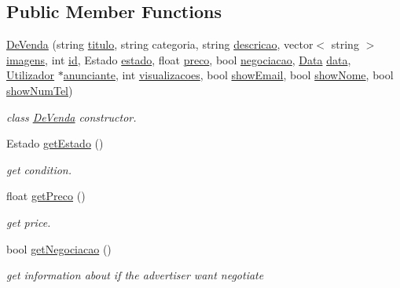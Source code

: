 \subsection*{Public Member Functions}
\begin{DoxyCompactItemize}
\item 
\hyperlink{class_de_venda_aa45120d3a08d48875df0068965e83362}{De\+Venda} (string \hyperlink{class_anuncio_adb34bedd8220f42b9ee37662c21313e6}{titulo}, string categoria, string \hyperlink{class_anuncio_aa6a9eb8d08cb06d16061b006eb2c8b97}{descricao}, vector$<$ string $>$ \hyperlink{class_anuncio_a9ff3646a44a2e285d082682e37631ac7}{imagens}, int \hyperlink{class_anuncio_a42900203e39da639a1128277dbd96baf}{id}, Estado \hyperlink{class_de_venda_a54648a4106f60e954441a6e121da8b81}{estado}, float \hyperlink{class_de_venda_a2e2c3efbd50a6778965e5383267c261a}{preco}, bool \hyperlink{class_de_venda_a45c4aa9333658f4b59c91dcaf22a0496}{negociacao}, \hyperlink{class_data}{Data} \hyperlink{class_anuncio_a2c35b71b56332894a705eb2770d5102b}{data}, \hyperlink{class_utilizador}{Utilizador} $\ast$\hyperlink{class_anuncio_ac89450835a3cd86dac14bda6dfd83934}{anunciante}, int \hyperlink{class_anuncio_ae3fb8cd61ec06485ee166cd3b5d80804}{visualizacoes}, bool \hyperlink{class_anuncio_a6a41218c0a11ba393522d3a9a80ded95}{show\+Email}, bool \hyperlink{class_anuncio_a50feea41d2253cd5168243b18fa03aa6}{show\+Nome}, bool \hyperlink{class_anuncio_a8db5dc7339e63974c643a6602f2cf7bc}{show\+Num\+Tel})
\begin{DoxyCompactList}\small\item\em class \hyperlink{class_de_venda}{De\+Venda} constructor. \end{DoxyCompactList}\item 
Estado \hyperlink{class_de_venda_a400617bb5fbb866a4dd525ecbd288814}{get\+Estado} ()
\begin{DoxyCompactList}\small\item\em get condition. \end{DoxyCompactList}\item 
float \hyperlink{class_de_venda_a0c73b2b38bd4220996052d4162015d98}{get\+Preco} ()
\begin{DoxyCompactList}\small\item\em get price. \end{DoxyCompactList}\item 
bool \hyperlink{class_de_venda_a4a87f1bd483110ea4c5b672ba44b71a9}{get\+Negociacao} ()
\begin{DoxyCompactList}\small\item\em get information about if the advertiser want negotiate \end{DoxyCompactList}\item 

\end{DoxyCompactItemize}
